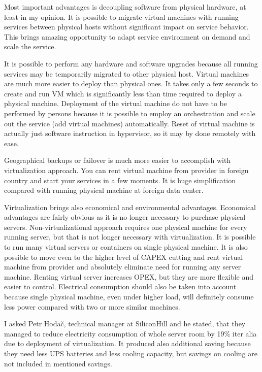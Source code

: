 
Most important advantages is decoupling software from physical hardware, at least in my opinion. It is possible to migrate virtual machines with running services between physical hosts without significant impact on service behavior. This brings amazing opportunity to adapt service environment on demand and scale the service.

It is possible to perform any hardware and software upgrades because all running services may be temporarily migrated to other physical host. Virtual machines are much more easier to deploy than physical ones. It takes only a few seconds to create and run \Ac{VM} which is significantly less than time required to deploy a physical machine. Deployment of the virtual machine do not have to be performed by persons because it is possible to employ an orchestration and scale out the service (add virtual machines) automatically.
Reset of virtual machine is actually just software instruction in hypervisor, so it may by done remotely with ease.

Geographical backups or failover is much more easier to accomplish with virtualization approach. You can rent virtual machine from provider in foreign country and start your services in a few moments. It is huge simplification compared with running physical machine at foreign data center.

Virtualization brings also economical and environmental advantages. Economical advantages are fairly obvious as it is no longer necessary to purchase physical servers. Non-virtualizational approach requires one physical machine for every running server, but that is not longer necessary with virtualization. It is possible to run many virtual servers or containers on single physical machine. It is also possible to move even to the higher level of \Ac{CAPEX} cutting and rent virtual machine from provider and absolutely eliminate need for running any server machine. Renting virtual server increases \Ac{OPEX}, but they are more flexible and easier to control.
Electrical consumption should also be taken into account because single physical machine, even under higher load, will definitely consume less power compared with two or more similar machines. 

I asked Petr Hodač, technical manager at SiliconHill and he stated, that they managed to reduce electricity consumption of whole server room by 19\% iter alia due to deployment of virtualization. It produced also additional saving because they need less \Ac{UPS} batteries and less cooling capacity, but savings on cooling are not included in mentioned savings.

